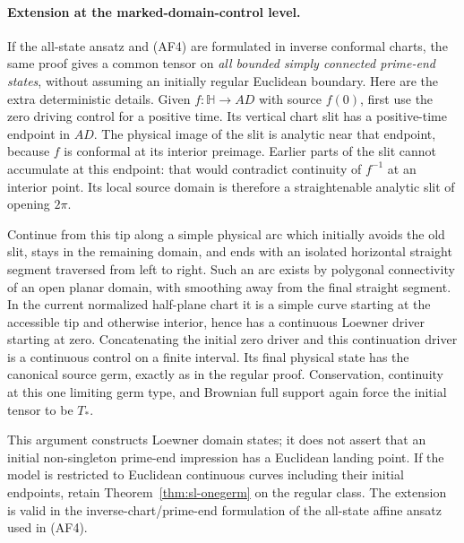 \documentclass[11pt]{article}
\theoremstyle{definition}\newtheorem{definition}[theorem]{Definition}
\theoremstyle{remark}\newtheorem{remark}[theorem]{Remark}
\begin{document}
\paragraph{Extension at the marked-domain-control level.}
If the all-state ansatz and (AF4) are formulated in inverse conformal charts,
the same proof gives a common tensor on \emph{all bounded simply connected
prime-end states}, without assuming an initially regular Euclidean boundary.
Here are the extra deterministic details. Given
$f:\mathbb H\to AD$ with source $f(0)$, first use the zero driving control
for a positive time. Its vertical chart slit has a positive-time endpoint
in $AD$. The physical image of the slit is analytic near that endpoint,
because $f$ is conformal at its interior preimage. Earlier parts of the
slit cannot accumulate at this endpoint: that would contradict continuity
of $f^{-1}$ at an interior point. Its local source domain is therefore a
straightenable analytic slit of opening $2\pi$.

Continue from this tip along a simple physical arc which initially avoids
the old slit, stays in the remaining domain, and ends with an isolated
horizontal straight segment traversed from left to right. Such an arc
exists by polygonal connectivity of an open planar domain, with smoothing
away from the final straight segment. In the current normalized half-plane
chart it is a simple curve starting at the accessible tip and otherwise
interior, hence has a continuous Loewner driver starting at zero.
Concatenating the initial zero driver and this continuation driver is a
continuous control on a finite interval. Its final physical state has the
canonical source germ, exactly as in the regular proof. Conservation,
continuity at this one limiting germ type, and Brownian full support again
force the initial tensor to be $T_*$.

This argument constructs Loewner domain states; it does not assert that an
initial non-singleton prime-end impression has a Euclidean landing point.
If the model is restricted to Euclidean continuous curves including their
initial endpoints, retain Theorem~\ref{thm:sl-onegerm} on the regular class.
The extension is valid in the inverse-chart/prime-end formulation of the
all-state affine ansatz used in (AF4).
\end{document}
